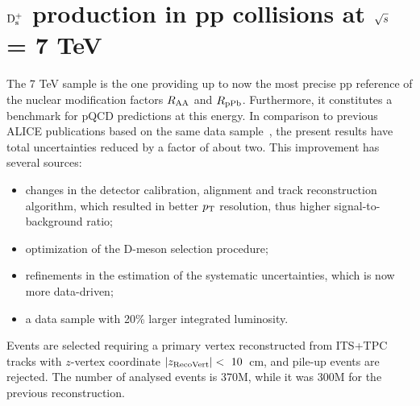 \chapter{${\rm D_s^+}$ production in pp collisions at $\sqrt{s}$ = 7 TeV}

The 7 TeV sample is the one providing up to now the most precise pp reference of
the nuclear modification factors $R_{\rm AA}$ and $R_{\rm pPb}$. 
Furthermore, it constitutes a benchmark for pQCD predictions
at this energy.
In comparison to previous ALICE publications based on the same data 
sample~\cite{ALICE:2011aa,Abelev:2012tca,Adam:2016ich}, the present 
results have total uncertainties reduced by a factor of about two. This improvement 
has several sources: 
\begin{itemize}
\item changes in the detector calibration, alignment and track reconstruction 
algorithm, which resulted in better $p_{\rm T}$ resolution, thus higher signal-to-background ratio; 
\item optimization of the D-meson selection procedure; 
\item refinements in the estimation of the systematic uncertainties, which is now more data-driven;
\item a data sample with 20\% larger integrated luminosity.
\end{itemize} 
Events are selected requiring a primary vertex reconstructed from ITS+TPC tracks with 
$z$-vertex coordinate $|z_{\rm RecoVert}|<~10$~cm, 
and pile-up events are rejected.  
The number of analysed events is 370M, while it was 300M for the previous reconstruction.

